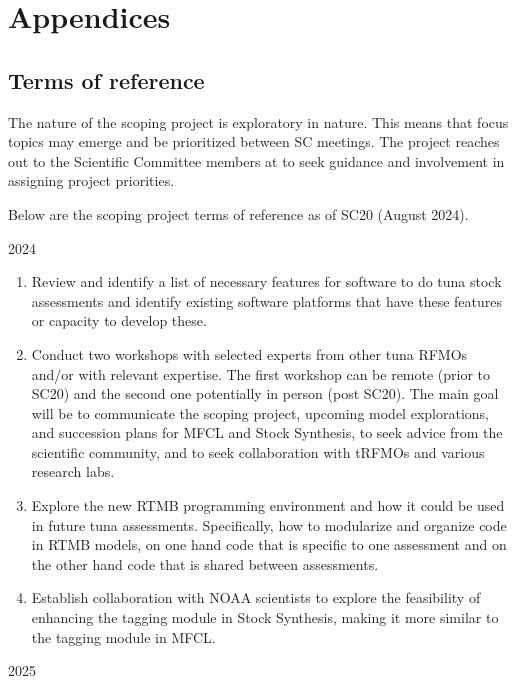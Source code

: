 \documentclass{SCreport}
\begin{document}
\newpage

\appendix

\section{Appendices}

\subsection{Terms of reference}
\label{sec:tor}

The nature of the scoping project is exploratory in nature. This means that
focus topics may emerge and be prioritized between SC meetings. The project
reaches out to the Scientific Committee members at to seek guidance and
involvement in assigning project priorities.

Below are the scoping project terms of reference as of SC20 (August 2024).

2024

\begin{enumerate}
  \item Review and identify a list of necessary features for software to do tuna
  stock assessments and identify existing software platforms that have these
  features or capacity to develop these.
  \item Conduct two workshops with selected experts from other tuna RFMOs and/or
  with relevant expertise. The first workshop can be remote (prior to SC20) and
  the second one potentially in person (post SC20). The main goal will be to
  communicate the scoping project, upcoming model explorations, and succession
  plans for MFCL and Stock Synthesis, to seek advice from the scientific
  community, and to seek collaboration with tRFMOs and various research labs.
  \item Explore the new RTMB programming environment and how it could be used in
  future tuna assessments. Specifically, how to modularize and organize code in
  RTMB models, on one hand code that is specific to one assessment and on the
  other hand code that is shared between assessments.
  \item Establish collaboration with NOAA scientists to explore the feasibility
  of enhancing the tagging module in Stock Synthesis, making it more similar to
  the tagging module in MFCL.
\end{enumerate}

2025
\end{document}
